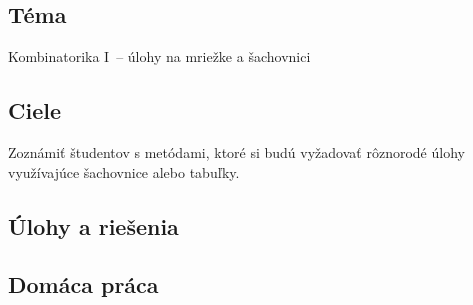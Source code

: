 

\subsection*{Téma}
Kombinatorika I~-- úlohy na mriežke a šachovnici
\subsection*{Ciele}
Zoznámiť študentov s metódami, ktoré si budú vyžadovať rôznorodé úlohy využívajúce šachovnice alebo tabuľky.

\subsection*{Úlohy a riešenia}















\subsection*{Domáca práca}






